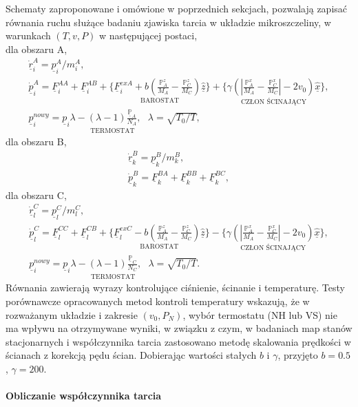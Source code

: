 \documentclass[12pt,a4paper,openright]{report} %
\begin{document}
Schematy zaproponowane i omówione w poprzednich sekcjach, pozwalają zapisać równania ruchu służące badaniu zjawiska tarcia w układzie mikroszczeliny, w warunkach $(T, v, P)$ w następującej postaci, \\
dla obszaru A,
%
\begin{equation}
\begin{gathered}
\underline{\dot{r}}^A_i=\underline{p}^A_i/m_i^A,
%
\\
%
\underline{\dot{p}}^A_i=\underline{F}^{AA}_i +
\underline{F}^{AB}_i +
\underset{\text{BAROSTAT}}{\Bigg\{ \underline{F}^{exA}_i + b \left(\frac{\mathbb{P}^z_A}{M_A} - \frac{\mathbb{P}^z_C}{M_C} \right) \hat{\underline{z}} \Bigg\}}  +
\underset{\text{CZŁON ŚCINAJĄCY}}{\Bigg\{ \gamma \left( \left| \frac{\mathbb{P}^x_A}{M_A} - \frac{\mathbb{P}^x_C}{M_C} \right| - 2v_0 \right) \hat{\underline{x}} \Bigg\}},
\\
\underset{\text{TERMOSTAT}}{\underline{p}^{nowy}_i= \underline{p}_i \lambda -
{\left(\lambda -1 \right)}\frac{\underline{\mathbb{P}}_{A}}{N_A},
~~~ \lambda=\sqrt{T_0/T}},
\label{sh2}
\end{gathered}
\end{equation}
%
dla obszaru B,
%
\begin{equation}
\begin{gathered}
\underline{\dot{r}}^B_k=\underline{p}^B_k/m_k^B,
\\
\underline{\dot{p}}^B_k=\underline{F}^{BA}_k +
\underline{F}^{BB}_k + \underline{F}^{BC}_k,
\label{sh4}
\end{gathered}
\end{equation}
%
dla obszaru C,
%
\begin{equation}
\begin{gathered}
\underline{\dot{r}}^C_l=\underline{p}^C_l/m_l^C,
\\
\underline{\dot{p}}^C_l=\underline{F}^{CC}_l +
\underline{F}^{CB}_l +
\underset{\text{BAROSTAT}}{\Bigg\{ \underline{F}^{exC}_l - b \left( \frac{\mathbb{P}^z_A}{M_A} - \frac{\mathbb{P}^z_C}{M_C} \right) \hat{\underline{z}} \Bigg\}} -
\underset{\text{CZŁON ŚCINAJĄCY}}{\Bigg\{ \gamma \left( \left| \frac{\mathbb{P}^x_A}{M_A} - \frac{\mathbb{P}^x_C}{M_C} \right| - 2v_0 \right) \hat{\underline{x}} \Bigg\}},\\
\underset{\text{TERMOSTAT}}{\underline{p}^{nowy}_i= \underline{p}_i \lambda -
{\left(\lambda -1 \right)}\frac{\underline{\mathbb{P}}_{C}}{N_C},
~~~\lambda=\sqrt{T_0/T}}.
\label{sh6}
\end{gathered}
\end{equation}
Równania zawierają wyrazy kontrolujące ciśnienie, ścinanie i temperaturę. Testy porównawcze opracowanych metod kontroli temperatury wskazują, że w rozważanym układzie i zakresie $(v_0, P_N)$, wybór termostatu (NH lub VS) nie ma wpływu na otrzymywane wyniki, w związku z czym, w badaniach map stanów stacjonarnych i współczynnika tarcia zastosowano metodę skalowania prędkości w ścianach z korekcją pędu ścian. Dobierając wartości stałych $b$ i $\gamma$, przyjęto $b=0.5$, $\gamma=200$.\\
\\
\textbf{Obliczanie współczynnika tarcia}
\end{document}
